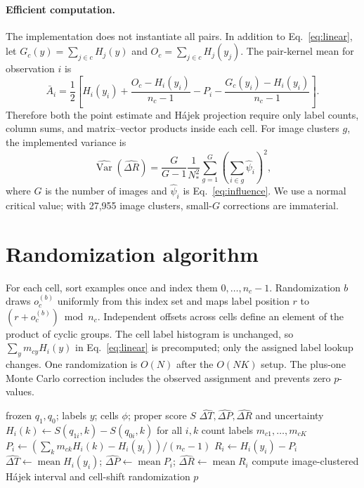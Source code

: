 \paragraph{Efficient computation.} The implementation does not instantiate all pairs. In addition to Eq.~\eqref{eq:linear},
let $G_c(y)=\sum_{j\in c}H_j(y)$ and $O_c=\sum_{j\in c}H_j(y_j)$. The pair-kernel mean
for observation $i$ is
\[
\bar A_i=\frac12\left[
H_i(y_i)+\frac{O_c-H_i(y_i)}{n_c-1}
-P_i-\frac{G_c(y_i)-H_i(y_i)}{n_c-1}
\right].
\]
Therefore both the point estimate and H\'ajek projection require only label counts,
column sums, and matrix--vector products inside each cell. For image clusters $g$, the
implemented variance is
\[
\widehat{\operatorname{Var}}(\widehat{\Delta R})
=\frac{G}{G-1}\frac1{N_*^2}\sum_{g=1}^G
\left(\sum_{i\in g}\widehat\psi_i\right)^2,
\]
where $G$ is the number of images and $\widehat\psi_i$ is
Eq.~\eqref{eq:influence}. We use a normal critical value; with 27,955 image clusters,
small-$G$ corrections are immaterial.

\section{Randomization algorithm}\label{app:random}

For each cell, sort examples once and index them $0,\ldots,n_c-1$. Randomization $b$
draws $o_c^{(b)}$ uniformly from this index set and maps label position $r$ to
$(r+o_c^{(b)})\bmod n_c$. Independent offsets across cells define an element of the
product of cyclic groups. The cell label histogram is unchanged, so
$\sum_y m_{cy}H_i(y)$ in Eq.~\eqref{eq:linear} is precomputed; only the assigned label
lookup changes. One randomization is $O(N)$ after the $O(NK)$ setup. The plus-one Monte
Carlo correction includes the observed assignment and prevents zero $p$-values.

\begin{algorithm}[t]
\caption{WAGER gain decomposition}\label{alg:wager}
\begin{algorithmic}[1]
\Require frozen $q_1,q_0$; labels $y$; cells $\phi$; proper score $S$
\Ensure $\widehat{\Delta T},\widehat{\Delta P},\widehat{\Delta R}$ and uncertainty
\State $H_i(k)\gets S(q_{1i},k)-S(q_{0i},k)$ for all $i,k$
  \State count labels $m_{c1},\ldots,m_{cK}$
    \State $P_i\gets(\sum_k m_{ck}H_i(k)-H_i(y_i))/(n_c-1)$
    \State $R_i\gets H_i(y_i)-P_i$
  \EndFor
\EndFor
\State $\widehat{\Delta T}\gets\operatorname{mean}H_i(y_i)$;
$\widehat{\Delta P}\gets\operatorname{mean}P_i$;
$\widehat{\Delta R}\gets\operatorname{mean}R_i$
\State compute image-clustered H\'ajek interval and cell-shift randomization $p$
\end{algorithmic}
\end{algorithm}

